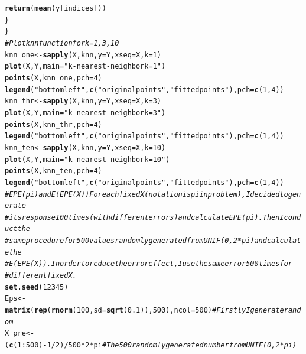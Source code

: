 \documentclass{article}\usepackage[]{graphicx}\usepackage[]{color}
\makeatletter
\newcommand{\hlnum}[1]{\textcolor[rgb]{0.686,0.059,0.569}{#1}}%
\newcommand{\hlstr}[1]{\textcolor[rgb]{0.192,0.494,0.8}{#1}}%
\newcommand{\hlcom}[1]{\textcolor[rgb]{0.678,0.584,0.686}{\textit{#1}}}%
\newcommand{\hlopt}[1]{\textcolor[rgb]{0,0,0}{#1}}%
\newcommand{\hlstd}[1]{\textcolor[rgb]{0.345,0.345,0.345}{#1}}%
\newcommand{\hlkwb}[1]{\textcolor[rgb]{0.69,0.353,0.396}{#1}}%
\newcommand{\hlkwc}[1]{\textcolor[rgb]{0.333,0.667,0.333}{#1}}%
\newcommand{\hlkwd}[1]{\textcolor[rgb]{0.737,0.353,0.396}{\textbf{#1}}}%
\newenvironment{kframe}{%
 \def\at@end@of@kframe{}%
 \ifinner\ifhmode%
  \def\at@end@of@kframe{\end{minipage}}%
  \begin{minipage}{\columnwidth}%
 \fi\fi%
 \def\FrameCommand##1{\hskip\@totalleftmargin \hskip-\fboxsep
 \colorbox{shadecolor}{##1}\hskip-\fboxsep
     \hskip-\linewidth \hskip-\@totalleftmargin \hskip\columnwidth}%
 \MakeFramed {\advance\hsize-\width
   \@totalleftmargin\z@ \linewidth\hsize
   \@setminipage}}%
 {\par\unskip\endMakeFramed%
 \at@end@of@kframe}
\newenvironment{knitrout}{}{} %
\makeatother
\begin{document}
\begin{knitrout}
\begin{kframe}
\begin{alltt}
        \hlkwd{return}\hlstd{(}\hlkwd{mean}\hlstd{(y[indices]))}
    \hlstd{\}}
\hlstd{\}}
\hlcom{# Plot knn function for k = 1,3,10}
\hlstd{knn_one} \hlkwb{<-} \hlkwd{sapply}\hlstd{(X, knn,} \hlkwc{y} \hlstd{= Y,} \hlkwc{xseq} \hlstd{= X,} \hlkwc{k} \hlstd{=} \hlnum{1}\hlstd{)}
\hlkwd{plot}\hlstd{(X, Y,} \hlkwc{main} \hlstd{=} \hlstr{"k-nearest-neighbor k = 1"}\hlstd{)}
\hlkwd{points}\hlstd{(X, knn_one,} \hlkwc{pch} \hlstd{=} \hlnum{4}\hlstd{)}
\hlkwd{legend}\hlstd{(}\hlstr{"bottomleft"}\hlstd{,} \hlkwd{c}\hlstd{(}\hlstr{"original points"}\hlstd{,} \hlstr{"fitted points"}\hlstd{),} \hlkwc{pch} \hlstd{=} \hlkwd{c}\hlstd{(}\hlnum{1}\hlstd{,} \hlnum{4}\hlstd{))}
\hlstd{knn_thr} \hlkwb{<-} \hlkwd{sapply}\hlstd{(X, knn,} \hlkwc{y} \hlstd{= Y,} \hlkwc{xseq} \hlstd{= X,} \hlkwc{k} \hlstd{=} \hlnum{3}\hlstd{)}
\hlkwd{plot}\hlstd{(X, Y,} \hlkwc{main} \hlstd{=} \hlstr{"k-nearest-neighbor k = 3"}\hlstd{)}
\hlkwd{points}\hlstd{(X, knn_thr,} \hlkwc{pch} \hlstd{=} \hlnum{4}\hlstd{)}
\hlkwd{legend}\hlstd{(}\hlstr{"bottomleft"}\hlstd{,} \hlkwd{c}\hlstd{(}\hlstr{"original points"}\hlstd{,} \hlstr{"fitted points"}\hlstd{),} \hlkwc{pch} \hlstd{=} \hlkwd{c}\hlstd{(}\hlnum{1}\hlstd{,} \hlnum{4}\hlstd{))}
\hlstd{knn_ten} \hlkwb{<-} \hlkwd{sapply}\hlstd{(X, knn,} \hlkwc{y} \hlstd{= Y,} \hlkwc{xseq} \hlstd{= X,} \hlkwc{k} \hlstd{=} \hlnum{10}\hlstd{)}
\hlkwd{plot}\hlstd{(X, Y,} \hlkwc{main} \hlstd{=} \hlstr{"k-nearest-neighbor k = 10"}\hlstd{)}
\hlkwd{points}\hlstd{(X, knn_ten,} \hlkwc{pch} \hlstd{=} \hlnum{4}\hlstd{)}
\hlkwd{legend}\hlstd{(}\hlstr{"bottomleft"}\hlstd{,} \hlkwd{c}\hlstd{(}\hlstr{"original points"}\hlstd{,} \hlstr{"fitted points"}\hlstd{),} \hlkwc{pch} \hlstd{=} \hlkwd{c}\hlstd{(}\hlnum{1}\hlstd{,} \hlnum{4}\hlstd{))}
\hlcom{# EPE(pi) and E(EPE(X)) For each fixed X(notation is pi in problem), I decided to generate}
\hlcom{# its response 100 times(with different errors) and calculate EPE(pi). Then I conduct the}
\hlcom{# same procedure for 500 values randomly generated from UNIF(0, 2*pi) and calculate the}
\hlcom{# E(EPE(X)). In order to reduce the error effect, I use the same error 500 times for}
\hlcom{# different fixed X.}
\hlkwd{set.seed}\hlstd{(}\hlnum{12345}\hlstd{)}
\hlstd{Eps} \hlkwb{<-} \hlkwd{matrix}\hlstd{(}\hlkwd{rep}\hlstd{(}\hlkwd{rnorm}\hlstd{(}\hlnum{100}\hlstd{,} \hlkwc{sd} \hlstd{=} \hlkwd{sqrt}\hlstd{(}\hlnum{0.1}\hlstd{)),} \hlnum{500}\hlstd{),} \hlkwc{ncol} \hlstd{=} \hlnum{500}\hlstd{)}  \hlcom{# Firstly I generate random}
\hlstd{X_pre} \hlkwb{<-} \hlstd{(}\hlkwd{c}\hlstd{(}\hlnum{1}\hlopt{:}\hlnum{500}\hlstd{)} \hlopt{-} \hlnum{1}\hlopt{/}\hlnum{2}\hlstd{)}\hlopt{/}\hlnum{500} \hlopt{*} \hlnum{2} \hlopt{*} \hlstd{pi}  \hlcom{# The 500 randomly generated number from        UNIF(0, 2*pi)}

\end{alltt}
\end{kframe}
\end{knitrout}
\end{document}
